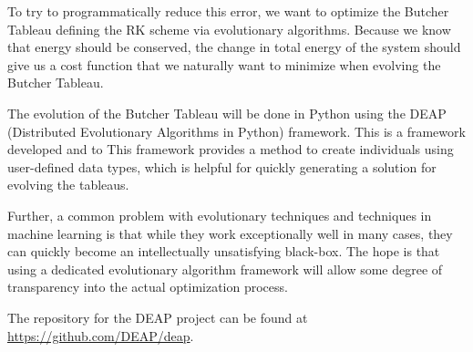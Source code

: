 \documentclass[onecolumn,titlepage,letterpaper,10pt]{article}
\begin{document}
To try to programmatically reduce this error, we want to optimize the
Butcher Tableau defining the RK scheme via evolutionary algorithms.
Because we know that energy should
be conserved, the change in total energy of the system should give us a cost
function that we naturally want to minimize when evolving the Butcher Tableau.

The evolution of the Butcher Tableau will be done in Python using the DEAP
(Distributed Evolutionary Algorithms in Python) framework. This is a framework
developed  and to
\cite{DEAP} This framework
provides a method to create
individuals using user-defined data types, which is helpful for quickly
generating a solution for evolving the tableaus.

Further, a common problem with evolutionary techniques and techniques in machine
learning is that while they work exceptionally well in many cases, they can
quickly become an intellectually unsatisfying black-box. The hope is that using
a dedicated evolutionary algorithm framework will allow some degree of
transparency into the actual optimization process.

The repository for the DEAP project can be found at
\url{https://github.com/DEAP/deap}.

\end{document}
